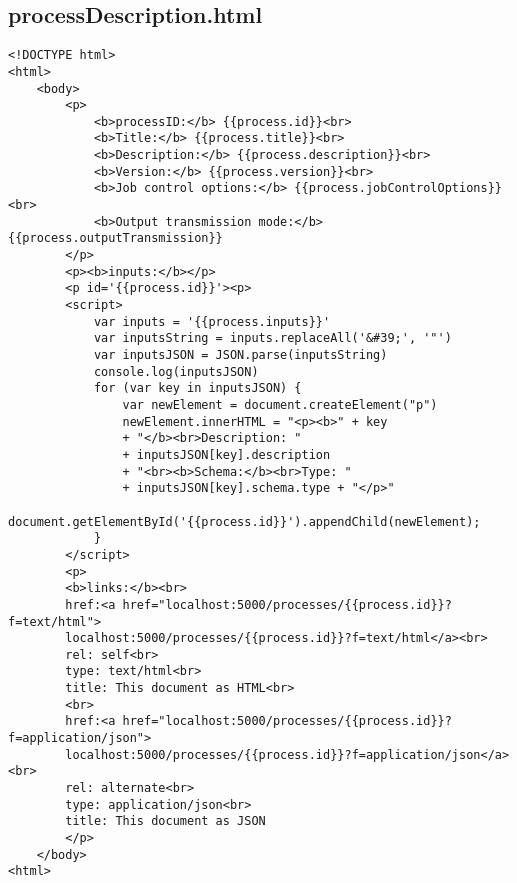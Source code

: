 \subsection{processDescription.html}
\begin{lstlisting}[caption={processDescription.html}, style = HTML]
<!DOCTYPE html>
<html>
	<body>
        <p>
            <b>processID:</b> {{process.id}}<br>
            <b>Title:</b> {{process.title}}<br>
            <b>Description:</b> {{process.description}}<br>
            <b>Version:</b> {{process.version}}<br>
            <b>Job control options:</b> {{process.jobControlOptions}}<br>
            <b>Output transmission mode:</b> {{process.outputTransmission}}
        </p>
        <p><b>inputs:</b></p>
        <p id='{{process.id}}'><p>
        <script>
            var inputs = '{{process.inputs}}'
            var inputsString = inputs.replaceAll('&#39;', '"')
            var inputsJSON = JSON.parse(inputsString)
            console.log(inputsJSON)
            for (var key in inputsJSON) {
                var newElement = document.createElement("p")
                newElement.innerHTML = "<p><b>" + key 
                + "</b><br>Description: " 
                + inputsJSON[key].description 
                + "<br><b>Schema:</b><br>Type: " 
                + inputsJSON[key].schema.type + "</p>"
                document.getElementById('{{process.id}}').appendChild(newElement);
            }
        </script>
        <p>
        <b>links:</b><br>
        href:<a href="localhost:5000/processes/{{process.id}}?f=text/html">
        localhost:5000/processes/{{process.id}}?f=text/html</a><br>
        rel: self<br>
        type: text/html<br>
        title: This document as HTML<br>
        <br>
        href:<a href="localhost:5000/processes/{{process.id}}?f=application/json">
        localhost:5000/processes/{{process.id}}?f=application/json</a><br>
        rel: alternate<br>
        type: application/json<br>
        title: This document as JSON
		</p>
	</body>
<html>
\end{lstlisting}\label{RessourceProcessDescriptionHTML}  

